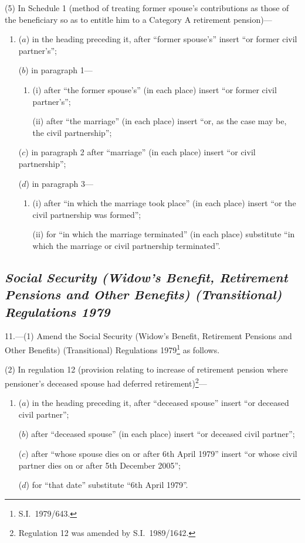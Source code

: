 \documentclass[12pt,a4paper]{article}
\begin{document}
(5) In Schedule 1 (method of treating former spouse’s contributions as those of the beneficiary so as to entitle him to a Category A retirement pension)—
\begin{enumerate}\item[]
($a$) in the heading preceding it, after “former spouse's” insert “or former civil partner's”;

($b$) in paragraph 1—
\begin{enumerate}\item[]
(i) after “the former spouse's” (in each place) insert “or former civil partner's”;

(ii) after “the marriage” (in each place) insert “or, as the case may be, the civil partnership”;
\end{enumerate}

($c$) in paragraph 2 after “marriage” (in each place) insert “or civil partnership”;

($d$) in paragraph 3—
\begin{enumerate}\item[]
(i) after “in which the marriage took place” (in each place) insert “or the civil partnership was formed”;

(ii) for “in which the marriage terminated” (in each place) substitute “in which the marriage or civil partnership terminated”.
\end{enumerate}
\end{enumerate}

\subsection*{\itshape\sloppy Social Security (Widow’s Benefit, Retirement Pensions and Other Benefits) (Transitional) Regulations 1979}

11.---(1)  Amend the Social Security (Widow’s Benefit, Retirement Pensions and Other Benefits) (Transitional) Regulations 1979\footnote{S.I.\ 1979/643.} as follows.

(2) In regulation 12 (provision relating to increase of retirement pension where pensioner’s deceased spouse had deferred retirement)\footnote{Regulation 12 was amended by S.I.\ 1989/1642.}—
\begin{enumerate}\item[]
($a$) in the heading preceding it, after “deceased spouse” insert “or deceased civil partner”;

($b$) after “deceased spouse” (in each place) insert “or deceased civil partner”;

($c$) after “whose spouse dies on or after 6th April 1979” insert “or whose civil partner dies on or after 5th December 2005”;

($d$) for “that date” substitute “6th April 1979”.
\end{enumerate}
\end{document}
